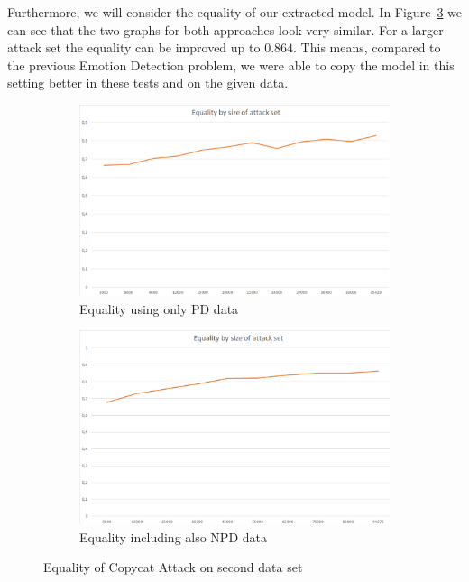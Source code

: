 \documentclass[a4paper,11pt]{article}
\begin{document}
        Furthermore, we will consider the equality of our extracted model. In Figure~\ref{fig:equality_cat} we can see that the two graphs for both approaches look very similar. For a larger attack set the equality can be improved up to $0.864$. This means, compared to the previous Emotion Detection problem, we were able to copy the model in this setting better in these tests and on the given data.
        
         \begin{figure}[h!]
            \centering
            \begin{subfigure}[c]{0.49\textwidth}
                \centering                \includegraphics[width=1\textwidth]{exercise_3/paper/images/Equality_copy_cat_domain.png}
                \caption{Equality using only PD data}
                \label{fig:Equality_cat_PD}
            \end{subfigure}
            \begin{subfigure}[c]{0.49\textwidth}
                \centering                \includegraphics[width=1\textwidth]{exercise_3/paper/images/Equality_copy_cat.png}
                \caption{Equality including also NPD data}
                \label{fig:equality_cat_PD+NPD}
            \end{subfigure}
            \caption{Equality of Copycat Attack on second data set}
            \label{fig:equality_cat}
        \end{figure}
        
\end{document}
